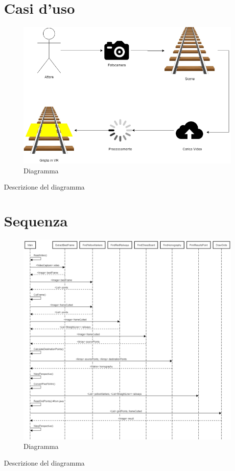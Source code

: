 \documentclass[twoside]{supsistudent}
\begin{document}
\section{Casi d'uso}
\begin{figure}[H]
  \center
  \includegraphics[scale=0.50]{images/UseCase.png}
  \caption{Diagramma}
\end{figure}
Descrizione del diagramma
\section{Sequenza}
\begin{figure}[H]
  \center
  \includegraphics[scale=0.32]{images/Sequence.png}
  \caption{Diagramma}
\end{figure}
Descrizione del diagramma
\end{document}

